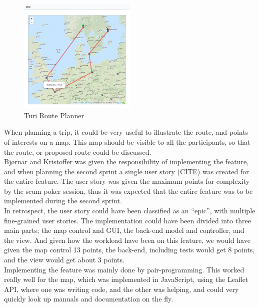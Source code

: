 \documentclass[a4paper]{article}
\begin{document}
\begin{figure}[!h]
  \begin{center}
    \includegraphics[width=0.5\textwidth]{pictures/route_planning}
  \end{center}
\caption{Turi Route Planner}
\label{fig:route}
\end{figure}

\noindent
When planning a trip, it could be very useful to illustrate the route, and points of interests on a map. This map should be visible to all the participants, so that the route, or proposed route could be discussed.\\

\noindent
Bjørnar and Kristoffer was given the responsibility of implementing the feature, and when planning the second sprint a single user story (CITE) was created for the entire feature. The user story was given the maximum points for complexity by the scum poker session, thus it was expected that the entire feature was to be implemented during the second sprint. \\

\noindent
In retrospect, the user story could have been classified as an “epic”, with multiple fine-grained user stories. The implementation could have been divided into three main parts; the map control and GUI, the back-end model and controller, and the view. And given how the workload have been on this feature, we would have given the map control 13 points, the back-end, including tests would get 8 points, and the view would get about 3 points. \\

\noindent
Implementing the feature was mainly done by pair-programming. This worked really well for the map, which was implemented in JavaScript, using the Leaflet API, where one was writing code, and the other was helping, and could very quickly look up manuals and documentation on the fly. \\
\end{document}

